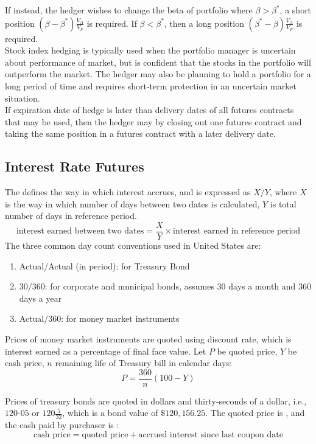 \documentclass[a4paper,oneside,openany]{book}
\begin{document}
If instead, the hedger wishes to change the beta of portfolio where $\beta > \beta^*$, a short position $(\beta - \beta^*)\frac{V_A}{V_F}$ is required. If $\beta < \beta^*$, then a long position $(\beta^* - \beta)\frac{V_A}{V_F}$ is required.\\

Stock index hedging is typically used when the portfolio manager is uncertain about performance of market, but is confident that the stocks in the portfolio will outperform the market. The hedger may also be planning to hold a portfolio for a long period of time and requires short-term protection in an uncertain market situation.\\

If expiration date of hedge is later than delivery dates of all futures contracts that may be used, then the hedger may  by closing out one futures contract and taking the same position in a futures contract with a later delivery date.

\subsection{Interest Rate Futures}

The  defines the way in which interest accrues, and is expressed as $X/Y$, where $X$ is the way in which number of days between two dates is calculated, $Y$ is total number of days in reference period.
\begin{equation*}
\text{interest earned between two dates} = \frac{X}{Y} \times \text{interest earned in reference period} \nonumber
\end{equation*}
The three common day count conventions used in United States are:
\begin{enumerate}[label=\roman*.]
\setlength{\itemsep}{0pt}
\item Actual/Actual (in period): for Treasury Bond
\item $30/360$: for corporate and municipal bonds, assumes $30$ days a month and $360$ days a year
\item Actual$/360$: for money market instruments
\end{enumerate}

Prices of money market instruments are quoted using discount rate, which is interest earned as a percentage of final face value. Let $P$ be quoted price, $Y$ be cash price, $n$ remaining life of Treasury bill in calendar days:
\begin{equation*}
P = \frac{360}{n}(100 - Y) \nonumber
\end{equation*}

Prices of treasury bonds are quoted in dollars and thirty-seconds of a dollar, i.e., $120$-$05$ or $120\frac{5}{32}$, which is a bond value of $\$120,156.25$. The quoted price is , and the cash paid by purchaser is :
\begin{equation*}
\text{cash price} = \text{quoted price} + \text{accrued interest since last coupon date} \nonumber
\end{equation*} 
\end{document}
